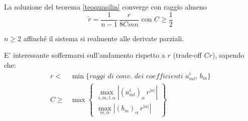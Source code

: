 \begin{theorem}
La soluzione del teorema \ref{teoquasilin} converge con raggio almeno
$$\widetilde{r} = \dfrac{1}{n-1}\, \dfrac{r}{8Cmn} \text{ con } C \geq \frac{1}{2}$$
\end{theorem}
\begin{remark}
$n \geq 2$ affinché il sistema si realmente alle derivate parziali. 
\end{remark}
\begin{remark}
E' interessante soffermarsi sull'andamento rispetto a $r$ (trade-off $Cr$), sapendo che:
\begin{align*}
r <& \min \{ \textit{raggi di conv. dei coefficienti } a^i_{ml}, \, b_m\} \\
C \geq & \max \begin{Bmatrix}
\max\limits_{i,m,l,\alpha } \left| (a^i_{ml})_\alpha \, r^{|\alpha |}\right|\\
\max\limits_{m,\alpha} \left|(b_m)_\alpha \, r^{|\alpha |}\right|
\end{Bmatrix}
\end{align*}
\end{remark}


